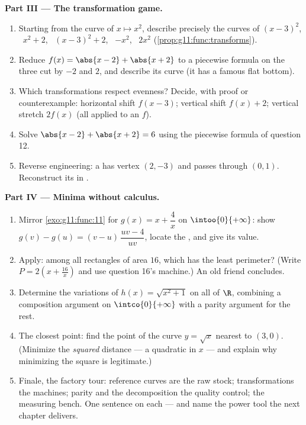 \begin{problem}
\medskip
\noindent\textbf{Part III --- The transformation game.}
\begin{enumerate}[resume]
  \item Starting from the curve of $x \mapsto x^2$, describe
        precisely the curves of $(x - 3)^2$, \ $x^2 + 2$, \
        $(x - 3)^2 + 2$, \ $-x^2$, \ $2x^2$
        (\cref{prop:g11:func:transforms}).
  \item Reduce $f(x) = \abs{x - 2} + \abs{x + 2}$ to a
        piecewise formula on the three  cut by $-2$
        and $2$, and describe its curve (it has a famous flat
        bottom).
  \item Which transformations respect evenness? Decide, with
        proof or counterexample: horizontal shift
        $f(x - 3)$; vertical shift $f(x) + 2$; vertical stretch
        $2 f(x)$ (all applied to an  $f$).
  \item Solve $\abs{x - 2} + \abs{x + 2} = 6$ using the
        piecewise formula of question 12.
  \item Reverse engineering: a  has vertex $(2, -3)$
        and passes through $(0, 1)$. Reconstruct its  in
        \omterm{thm:g11:quad:canonical}{canonical form}.
\end{enumerate}

\medskip
\noindent\textbf{Part IV --- Minima without calculus.}
\begin{enumerate}[resume]
  \item Mirror \cref{exo:g11:func:11} for
        $g(x) = x + \dfrac4x$ on $\intoo{0}{+\infty}$: show
        $g(v) - g(u) = (v - u)\,\dfrac{uv - 4}{uv}$, locate the
        , and give its value.
  \item Apply: among all rectangles of area $16$, which has the
        least perimeter? (Write $P = 2\left(x +
        \frac{16}{x}\right)$ and use question 16's machine.) An
        old friend concludes.
  \item Determine the variations of
        $h(x) = \sqrt{x^2 + 1}$ on all of $\R$, combining a
        composition argument on $\intco{0}{+\infty}$ with a
        parity argument for the rest.
  \item The closest point: find the point of the curve
        $y = \sqrt x$ nearest to $(3, 0)$. (Minimize the
        \emph{squared} distance --- a quadratic in $x$ --- and
        explain why minimizing the square is legitimate.)
  \item Finale, the factory tour: reference curves are the raw
        stock; transformations the machines; parity and the
        decomposition the quality control; 
        the measuring bench. One sentence on each --- and name
        the power tool the next chapter delivers.
\end{enumerate}
\end{problem}

